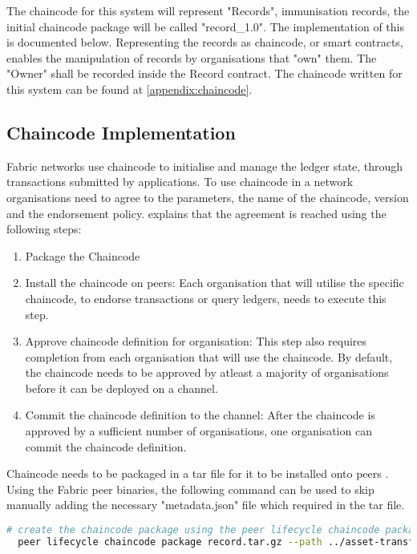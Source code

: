 The chaincode for this system will represent "Records", immunisation records, the initial chaincode package will be called "record\_1.0". The implementation of this is documented below. 
Representing the records as chaincode, or smart contracts, enables the manipulation of records by organisations that "own" them. The "Owner" shall be recorded inside the Record contract. 
The chaincode written for this system can be found at \ref{appendix:chaincode}.

\subsection{Chaincode Implementation}
Fabric networks use chaincode to initialise and manage the ledger state, through transactions submitted by applications. \cite{noauthor_writing_nodate}
To use chaincode in a network organisations need to agree to the parameters, the name of the chaincode, version and the endorsement policy. 
\cite{noauthor_writing_nodate} explains that the agreement is reached using the following steps:
\begin{enumerate}
  \item Package the Chaincode
  \item Install the chaincode on peers: Each organisation that will utilise the specific chaincode, to endorse transactions or query ledgers, needs to execute this step.
  \item Approve chaincode definition for organisation: This step also requires completion from each organisation that will use the chaincode. By default, the chaincode needs to be approved by atleast a majority of organisations before it can be deployed on a channel.
  \item Commit the chaincode definition to the channel: After the chaincode is approved by a sufficient number of organisations, one organisation can commit the chaincode definition.
\end{enumerate}

Chaincode needs to be packaged in a tar file for it to be installed onto peers \cite{noauthor_fabric_nodate}. Using the Fabric peer binaries, the following command can be used to skip manually adding the necessary "metadata.json" file which required in the tar file.
\begin{lstlisting}[language=bash, caption={peer lifecycle chaincode package command}]
  # create the chaincode package using the peer lifecycle chaincode package command
  peer lifecycle chaincode package record.tar.gz --path ../asset-transfer-basic/chaincode-go/ --lang golang --label record_1.0
\end{lstlisting}

